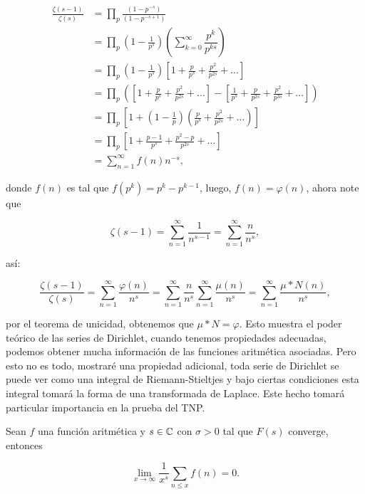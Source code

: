 $$\begin{aligned}
\frac{\zeta(s-1)}{\zeta(s)} & =\prod_{p} \frac{\left(1-p^{-s}\right)}{\left(1-p^{-s+1}\right)} \\
&=\prod_{p}\left(1-\frac{1}{p^s}\right)\left(\sum_{k=0}^{\infty}\dfrac{p^k}{p^{ks}}\right)\\
& =\prod_{p}\left(1-\frac{1}{p^s}\right)\left[1+\frac{p}{p^s}+\frac{p^2}{p^{2 s}}+\ldots\right] \\
& =\prod_{p}\left(\left[1+\frac{p}{p^s}+\frac{p^2}{p^{2 s}}+\ldots\right]-\left[\frac{1}{p^s}+\frac{p}{p^{2 s}}+\frac{p^2}{p^{3 s}}+\ldots\right]\right) \\
& =\prod_{p }\left[1+\left(1-\frac{1}{p}\right)\left(\frac{p}{p^s}+\frac{p^2}{p^{2 s}}+\ldots\right)\right] \\
&=\prod_{p }\left[1+\frac{p-1}{p^s}+\frac{p^2-p}{p^{2 s}}+\ldots\right]\\
& =\sum_{n=1}^{\infty}f(n)n^{-s},
\end{aligned}$$

donde $f(n)$ es tal que $f(p^{k})=p^{k}-p^{k-1}$, luego, $f(n)=\varphi(n)$, ahora note que

$$\zeta(s-1)=\sum_{n=1}^{\infty} \frac{1}{n^{s-1}}=\sum_{n=1}^{\infty} \frac{n}{n^s},$$

así:

$$\frac{\zeta(s-1)}{\zeta(s)}=\sum_{n=1}^{\infty} \frac{\varphi(n)}{n^s}=\sum_{n=1}^{\infty} \frac{n}{n^s}\sum_{n=1}^{\infty} \frac{\mu(n)}{n^s}=\sum_{n=1}^{\infty} \frac{\mu*N(n)}{n^s},$$

por el teorema de unicidad, obtenemos que $\mu*N=\varphi$. Esto muestra el poder teórico de las series de Dirichlet, cuando tenemos propiedades adecuadas, podemos obtener mucha información de las funciones aritmética asociadas. Pero esto no es todo, mostraré una propiedad adicional, toda serie de Dirichlet se puede ver como una integral de Riemann-Stieltjes y bajo ciertas condiciones esta integral tomará la forma de una transformada de Laplace. Este hecho tomará particular importancia en la prueba del TNP.\\

\begin{lemma}[Kronecker]
Sean $f$ una función aritmética y $s\in \mathbb{C}$ con $\sigma>0$ tal que $F(s)$ converge, entonces

$$\lim_{x \to \infty} \frac{1}{x^s}\sum_{n\leq x}f(n)=0.$$
\end{lemma}

